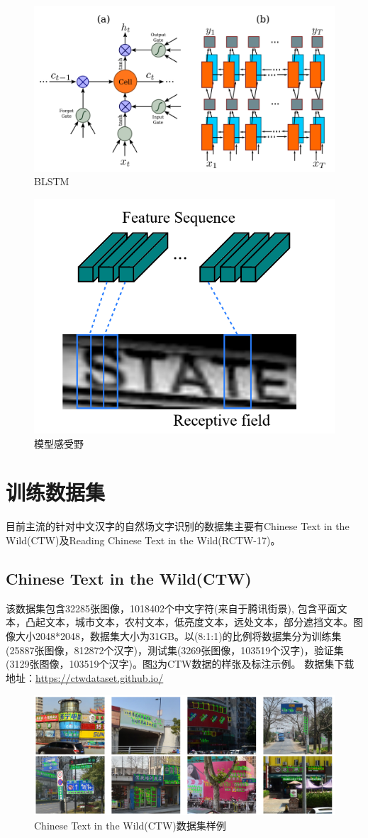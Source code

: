 \documentclass[12pt,a4paper]{ctexart}
\begin{document}
\begin{figure}
	\centering
	\includegraphics[width=0.7\linewidth]{images/blstm}
	\caption{BLSTM}
	\label{fig:blstm}
\end{figure}
\begin{figure}
	\centering
	\includegraphics[width=0.5\linewidth]{images/receptive_field}
	\caption{模型感受野}
	\label{fig:receptive_field}
\end{figure}


\section{训练数据集}
目前主流的针对中文汉字的自然场文字识别的数据集主要有Chinese Text in the Wild(CTW)\cite{CTW}及Reading Chinese Text in the Wild(RCTW-17)\cite{RCTW-17}。
\subsection{Chinese Text in the Wild(CTW)}
该数据集包含32285张图像，1018402个中文字符(来自于腾讯街景), 包含平面文本，凸起文本，城市文本，农村文本，低亮度文本，远处文本，部分遮挡文本。图像大小2048*2048，数据集大小为31GB。以(8:1:1)的比例将数据集分为训练集(25887张图像，812872个汉字)，测试集(3269张图像，103519个汉字)，验证集(3129张图像，103519个汉字)。图\ref{fig:ctw-example}为CTW数据的样张及标注示例。
数据集下载地址：\url{https://ctwdataset.github.io/}
\begin{figure}[H]
	\centering
	\includegraphics[width=1\linewidth]{images/ctw_example}
	\caption{Chinese Text in the Wild(CTW)数据集样例}
	\label{fig:ctw-example}
\end{figure}
\end{document}
